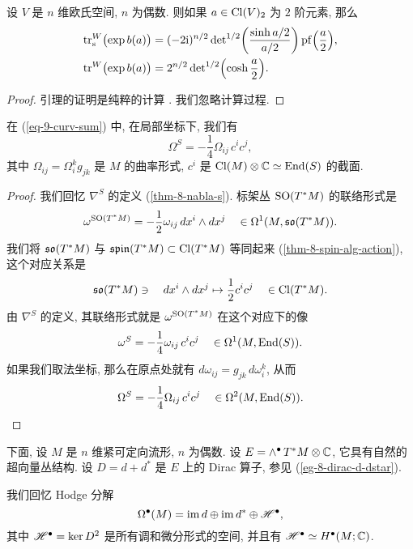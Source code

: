 \begin{lemma} \label{thm-9-tr-exp-b}
    设 $V$ 是 $n$ 维欧氏空间, $n$ 为偶数.
    则如果 $a \in \operatorname{Cl} (V)_2$ 为 $2$ 阶元素, 那么
    \begin{align*}
        \operatorname{tr}_{\mathrm{s}}^W \bigl( \exp b(a) \bigr)
        &= (-2 \mathrm{i})^{n/2} \operatorname{det}^{1/2} \biggl( \frac{\sinh a/2}{a/2} \biggr)
            \operatorname{pf} \Bigl( \frac{a}{2} \Bigr), \\
        \operatorname{tr}^W \bigl( \exp b (a) \bigr)
        &= 2^{n/2} \operatorname{det}^{1/2} \Bigl( \cosh \frac{a}{2} \Bigr).
    \end{align*}
\end{lemma}

\begin{proof}
    引理的证明是纯粹的计算 \cite[引理~4.4]{bgv}.
    我们忽略计算过程.
\end{proof}

\begin{lemma} \label{thm-9-omega-s}
    在 (\ref{eq-9-curv-sum}) 中, 在局部坐标下, 我们有
    \[ \Omega^S = -\frac14 \Omega_{ij} \, c^i c^j, \]
    其中 $\Omega_{ij} = \Omega_i^k g_{jk}$ 是 $M$ 的曲率形式,
    $c^i$ 是 $\operatorname{Cl} (M) \otimes \mathbb{C} \simeq \operatorname{End} (S)$ 的截面.
\end{lemma}

\begin{proof}
    我们回忆 $\nabla^S$ 的定义 (\ref{thm-8-nabla-s}).
    标架丛 $\mathrm{SO} (T^* M)$ 的联络形式是
    \[ \omega^{\mathrm{SO} (T^* M)} = - \frac12 \omega_{ij} \, dx^i \wedge dx^j
        \quad \in \Omega^1 (M, \mathfrak{so} (T^* M)). \]
    我们将 $\mathfrak{so} (T^* M)$ 与 $\mathfrak{spin} (T^* M) \subset \operatorname{Cl} (T^* M)$
    等同起来 (\ref{thm-8-spin-alg-action}), 这个对应关系是
    \[ \mathfrak{so} (T^* M) \ni \quad dx^i \wedge dx^j \mapsto
        \frac12 c^i c^j \quad \in \operatorname{Cl} (T^* M). \]
    由 $\nabla^S$ 的定义, 其联络形式就是
    $\omega^{\mathrm{SO} (T^* M)}$ 在这个对应下的像
    \[ \omega^S = - \frac14 \omega_{ij} \, c^i c^j
        \quad \in \Omega^1 (M, \operatorname{End} (S)). \]
    如果我们取法坐标, 那么在原点处就有
    $d \omega_{ij} = g_{jk} \, d \omega_i^k$, 从而
    \[ \Omega^S = - \frac14 \Omega_{ij} \, c^i c^j
        \quad \in \Omega^2 (M, \operatorname{End} (S)). \qedhere \]
\end{proof}

下面, 设 $M$ 是 $n$ 维紧可定向流形, $n$ 为偶数.
设 $E = \wedge^{\bullet} \, T^* M \otimes \mathbb{C}$, 它具有自然的超向量丛结构.
设 $D = d + d^*$ 是 $E$ 上的 Dirac 算子, 参见 (\ref{eg-8-dirac-d-dstar}).

我们回忆 Hodge 分解
\[ \Omega^\bullet (M) = \operatorname{im} d \oplus \operatorname{im} d^* \oplus \mathscr{H}^\bullet, \]
其中 $\mathscr{H}^\bullet = \ker D^2$ 是所有调和微分形式的空间,
并且有 $\mathscr{H}^\bullet \simeq H^\bullet (M; \mathbb{C})$.

